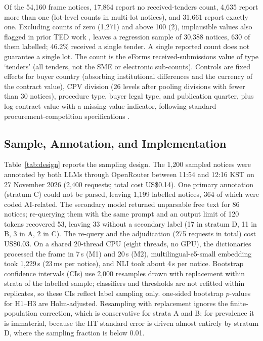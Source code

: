 \documentclass[runningheads]{llncs}
\begin{document}
Of the 54,160 frame notices, 17,864 report no received-tenders count, 4,635 report more than one (lot-level counts in multi-lot notices), and 31,661 report exactly one. Excluding counts of zero (1,271) and above 100 (2), implausible values also flagged in prior TED work \cite{potin2023}, leaves a regression sample of 30,388 notices, 630 of them labelled; 46.2\% received a single tender. A single reported count does not guarantee a single lot. The count is the eForms received-submissions value of type `tenders' (all tenders, not the SME or electronic sub-counts).
Controls are fixed effects for buyer country (absorbing institutional differences and the currency of the contract value), CPV division (26 levels after pooling divisions with fewer than 30 notices),
procedure type, buyer legal type, and publication quarter, plus log contract value with a missing-value indicator, following standard procurement-competition specifications \cite{fazekas2016,decarolis2022}.

\subsection{Sample, Annotation, and Implementation}
Table~\ref{tab:design} reports the sampling design. The 1,200 sampled notices were annotated by both LLMs through OpenRouter between 11:54 and 12:16 KST on 27 November 2026 (2,400 requests; total cost US\$0.14). One primary annotation (stratum C) could not be parsed, leaving 1,199 labelled notices, 364 of which were coded AI-related. The secondary model returned unparsable free text for 86 notices; re-querying them with the same prompt and an output limit of 120 tokens recovered 53, leaving 33 without a secondary label (17 in stratum D, 11 in B, 3 in A, 2 in C). The re-query and the adjudication (275 requests in total) cost US\$0.03.
On a shared 20-thread CPU (eight threads, no GPU), the dictionaries processed the frame in 7\,s (M1) and 20\,s (M2), multilingual-e5-small embedding took 1,229\,s (23\,ms per notice), and NLI took about 4\,s per notice. Bootstrap confidence intervals (CIs) use 2,000 resamples drawn with replacement within strata of the labelled sample; classifiers and thresholds are not refitted within replicates, so these CIs reflect label sampling only.
one-sided bootstrap $p$-values for H1--H3 are Holm-adjusted. Resampling with replacement ignores the finite-population correction, which is conservative for strata A and B; for prevalence it is immaterial, because the HT standard error is driven almost entirely by stratum D, where the sampling fraction is below 0.01.
\end{document}
